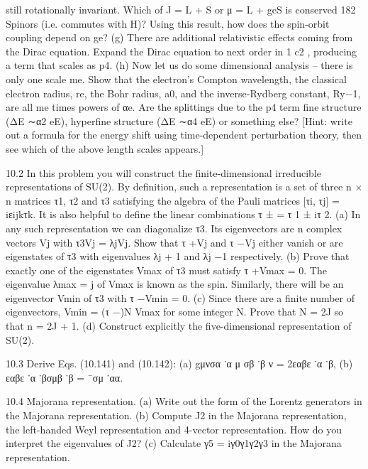 still rotationally invariant. Which of ⃗J = ⃗L + ⃗S or ⃗μ = ⃗L + ge⃗S is conserved
182
Spinors
(i.e. commutes with ⃗H)? Using this result, how does the spin-orbit coupling
depend on ge?
(g) There are additional relativistic effects coming from the Dirac equation. Expand
the Dirac equation to next order in 1
c2 , producing a term that scales as ⃗p4.
(h) Now let us do some dimensional analysis – there is only one scale me. Show that
the electron’s Compton wavelength, the classical electron radius, re, the Bohr
radius, a0, and the inverse-Rydberg constant, Ry−1, are all me times powers of
αe. Are the splittings due to the p4 term ﬁne structure (ΔE ∼α2
eE), hyperﬁne
structure (ΔE ∼α4
eE) or something else? [Hint: write out a formula for the
energy shift using time-dependent perturbation theory, then see which of the
above length scales appears.]

10.2 In this problem you will construct the ﬁnite-dimensional irreducible representations
of SU(2). By deﬁnition, such a representation is a set of three n × n matrices τ1, τ2
and τ3 satisfying the algebra of the Pauli matrices [τi, τj] = iεijkτk. It is also helpful
to deﬁne the linear combinations τ ± = τ 1 ± iτ 2.
(a) In any such representation we can diagonalize τ3. Its eigenvectors are n complex
vectors Vj with τ3Vj = λjVj. Show that τ +Vj and τ −Vj either vanish or are
eigenstates of τ3 with eigenvalues λj + 1 and λj −1 respectively.
(b) Prove that exactly one of the eigenstates Vmax of τ3 must satisfy τ +Vmax = 0.
The eigenvalue λmax = j of Vmax is known as the spin. Similarly, there will be
an eigenvector Vmin of τ3 with τ −Vmin = 0.
(c) Since there are a ﬁnite number of eigenvectors, Vmin = (τ −)N Vmax for some
integer N. Prove that N = 2J so that n = 2J + 1.
(d) Construct explicitly the ﬁve-dimensional representation of SU(2).

10.3 Derive Eqs. (10.141) and (10.142):
(a) gμνσα ˙α
μ σβ ˙β
ν
= 2εαβε ˙α ˙β,
(b) εαβε ˙α ˙βσμβ ˙β = ¯σμ
˙αα.

10.4 Majorana representation.
(a) Write out the form of the Lorentz generators in the Majorana representation.
(b) Compute ⃗J2 in the Majorana representation, the left-handed Weyl representation
and 4-vector representation. How do you interpret the eigenvalues of ⃗J2?
(c) Calculate γ5 = iγ0γ1γ2γ3 in the Majorana representation.

